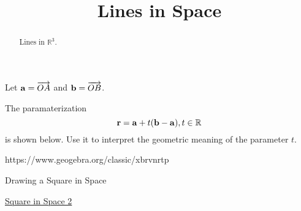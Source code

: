 \documentclass{ximera}
\title{Lines in Space}
\begin{document}
\begin{abstract}
Lines in $\mathbb{R}^3$.
\end{abstract}
\maketitle


\begin{exploration}   \label{Exsd67g:Line}
Let ${\bf a} = \overrightarrow{OA}$ and  ${\bf b} = \overrightarrow{OB}$.

The paramaterization 
\[
    {\bf r} = {\bf a} + t({\bf b} - {\bf a}) , t\in \mathbb{R}
\]
is shown below. Use it to interpret the geometric meaning of the parameter $t$.

 
\begin{onlineOnly}
    \begin{center}
\end{center}
\end{onlineOnly}

\end{exploration}

https://www.geogebra.org/classic/xbrvnrtp


Drawing a Square in Space

\href{https://www.desmos.com/3d/3a19b63ef0}{Square in Space 2}
\end{document}
